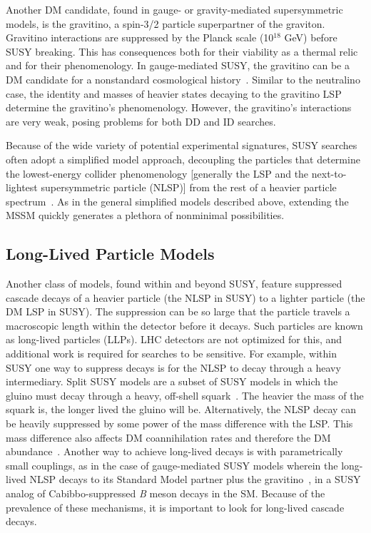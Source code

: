 \documentclass{ar-1col}
\begin{document}
Another DM candidate, found in gauge- or gravity-mediated supersymmetric
models, is the gravitino, a spin-3/2 particle superpartner of the
graviton. Gravitino interactions are suppressed by the Planck
scale (10$^{18}$ GeV) before SUSY breaking. This has consequences
both for their viability as a thermal relic and for their
phenomenology. In gauge-mediated SUSY, the gravitino can be a DM
candidate for a nonstandard cosmological
history~\cite{Dimopoulos:1996vz}. Similar to the neutralino case,
the identity and masses of heavier states decaying to the
gravitino LSP determine the gravitino's phenomenology. However, the gravitino's
interactions are very weak, posing problems for both DD and
ID searches.

Because of the wide variety of potential experimental signatures,
SUSY searches often adopt a simplified model approach,
decoupling the particles that determine the lowest-energy collider
phenomenology [generally the LSP and the next-to-lightest supersymmetric particle (NLSP)] from the rest of a heavier
particle spectrum~\cite{Alves:2011wf}. 
As in the general simplified models described above, extending the MSSM quickly
generates a plethora of nonminimal possibilities.

\subsection{Long-Lived Particle Models}\label{sec:LLPModels}

Another class of models, found within and beyond SUSY, feature suppressed cascade decays of a heavier particle (the NLSP
in SUSY) to a lighter particle (the DM LSP in SUSY). The
suppression can be so large that the particle travels a
macroscopic length within the detector before it decays. Such particles are known as long-lived particles (LLPs).
LHC detectors are not optimized for this, and additional work is required
for searches to be sensitive. 
For example, within SUSY one way to suppress decays is for the NLSP to decay
through a heavy intermediary. Split SUSY models are a
subset of SUSY models in which the gluino must decay through a heavy,
off-shell squark~\cite{Masiero:2004ft}. The heavier the mass of
the squark is, the longer lived the gluino will be. Alternatively, the NLSP
decay can be heavily suppressed by some power of the mass
difference with the LSP. This mass difference also affects DM
coannihilation rates and therefore the DM
abundance~\cite{Ellis:1999mm}. Another way to achieve
long-lived decays is with parametrically small couplings, as in
the case of gauge-mediated SUSY models wherein the
long-lived NLSP decays to its Standard Model partner plus the
gravitino~\cite{Dimopoulos:1996vz}, in a SUSY analog of Cabibbo-suppressed \textit{B} meson decays in the SM. Because of the prevalence of
these mechanisms, it is important to look for long-lived cascade
decays.
\end{document}
